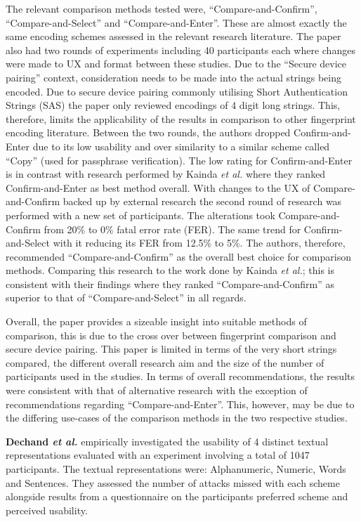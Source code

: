 The relevant comparison methods tested were, 
``Compare-and-Confirm'', ``Compare-and-Select'' and ``Compare-and-Enter''. These are almost exactly the same encoding schemes assessed in the relevant research literature. The paper also had two rounds of experiments including 40 participants each where changes were made to UX and format between these studies. 
Due to the ``Secure device pairing'' context, consideration needs to be made into the actual strings being encoded. Due to secure device pairing commonly utilising Short Authentication Strings (SAS) the
paper only reviewed encodings of 4 digit long strings. This, therefore, limits the applicability of the results in comparison to other fingerprint encoding literature. Between the two rounds, the authors dropped Confirm-and-Enter due to its low usability and over similarity to a similar scheme called ``Copy'' (used for passphrase verification). The low rating for Confirm-and-Enter is in contrast with research performed by Kainda \textit{et al.}\cite{kainda2009usability} where they ranked Confirm-and-Enter as best method overall. With changes to the UX of Compare-and-Confirm backed up by external research \cite{palmer1990attentional}\cite{hammer2009category} the second round of research was performed with a new set of participants. The alterations took Compare-and-Confirm from 20\% to 0\% fatal error rate (FER). The same trend for Confirm-and-Select with it reducing its FER from 12.5\% to 5\%. The authors, therefore, recommended ``Compare-and-Confirm'' as the overall best choice for comparison methods. Comparing this research to the work done by Kainda \textit{et al.}\cite{kainda2009usability}; this is consistent with their findings where they ranked ``Compare-and-Confirm'' as superior to that of ``Compare-and-Select'' in all regards.

Overall, the paper provides a sizeable insight into suitable methods of comparison, this is due to the cross over between fingerprint comparison and secure device pairing. This paper is limited in terms of the very short strings compared, the different overall research aim and the size of the number of participants used in the studies. In terms of overall recommendations, the results were consistent with that of alternative research with the exception of recommendations regarding ``Compare-and-Enter''. This, however, may be due to the differing use-cases of the comparison methods in the two respective studies.

\textbf{Dechand \textit{et al.}}\cite{dechand2016empirical} empirically investigated the usability of 4 distinct textual representations evaluated with an experiment involving a total of 1047 participants. The textual representations were: Alphanumeric, Numeric, Words and Sentences. They assessed the number of attacks missed with each scheme alongside results from a questionnaire on the participants preferred scheme and perceived usability.

